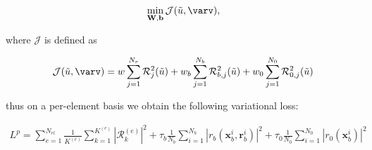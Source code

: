 \begin{align}
  \min_{\mathbf{W}, \mathbf{b}} \mathcal{J} (\tilde{u}, \varv),
\end{align}

where $\mathcal{J}$ is defined as

\begin{align}
  \mathcal{J} (\tilde{u}, \varv) = w \sum_{j=1}^{N_r} \mathcal{R}_j^{2} (\tilde{u}) + w_b \sum_{j=1}^{N_b} \mathcal{R}_{b,j}^{2} (\tilde{u}) + w_0 \sum_{j=1}^{N_0} \mathcal{R}_{0,j}^{2} (\tilde{u})
\end{align}

thus on a per-element basis we obtain the following variational loss:

\begin{align}
  L^p = \sum_{e=1}^{N_{el}}\frac{1}{K^{(e)}}\sum_{k=1}^{K^{(e)}}\left|\mathcal{R}_k^{(e)}\right|^2 + \tau_b\frac{1}{N_b}\sum_{i=1}^{N_b}\left|r_b(\mathbf{x}_b^i,\mathbf{r}_b^i)\right|^2 + \tau_0\frac{1}{N_0}\sum_{i=1}^{N_0}\left|r_0(\mathbf{x}_b^i)\right|^2
\end{align}
